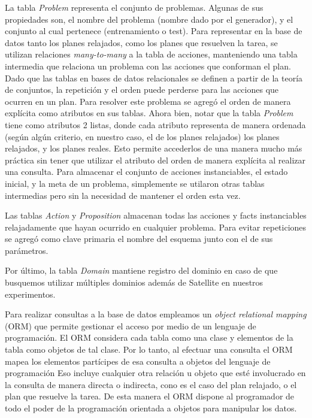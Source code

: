 La tabla \emph{Problem} representa el conjunto de problemas. Algunas de sus
propiedades son, el nombre del problema (nombre dado por el generador), y el
conjunto al cual pertenece (entrenamiento o test). Para representar en la base
de datos tanto los planes relajados, como los planes que resuelven la tarea, se
utilizan relaciones \emph{many-to-many} a la tabla de acciones, manteniendo una
tabla intermedia que relaciona un problema con las acciones que conforman el
plan. Dado que las tablas en bases de datos relacionales se definen a partir de
la teoría de conjuntos, la repetición y el orden puede perderse para las
acciones que ocurren en un plan. Para resolver este problema se agregó el orden
de manera explícita como atributos en sus tablas. Ahora bien, notar que la tabla
\emph{Problem} tiene como atributos 2 listas, donde cada atributo representa de
manera ordenada (según algún criterio, en nuestro caso, el de los planes
relajados) los planes relajados, y los planes reales. Esto permite accederlos de
una manera mucho más práctica sin tener que utilizar el atributo del orden de
manera explícita al realizar una consulta. Para almacenar el conjunto de
acciones instanciables, el estado inicial, y la meta de un problema, simplemente
se utilaron otras tablas intermedias pero sin la necesidad de mantener el orden
esta vez.

Las tablas \emph{Action} y \emph{Proposition} almacenan todas las acciones y
facts instanciables relajadamente que hayan ocurrido en cualquier problema. Para
evitar repeticiones se agregó como clave primaria el nombre del esquema junto
con el de sus parámetros.

Por último, la tabla \emph{Domain} mantiene registro del dominio en caso de que
busquemos utilizar múltiples dominios además de Satellite en nuestros
experimentos.

Para realizar consultas a la base de datos empleamos un \emph{object relational
mapping} (ORM) que permite gestionar el acceso por medio de un lenguaje de
programación. El ORM considera cada tabla como una clase y elementos de la tabla
como objetos de tal clase. Por lo tanto, al efectuar una consulta el ORM mapea
los elementos partícipes de esa consulta a objetos del lenguaje de programación
Eso incluye cualquier otra relación u objeto que esté involucrado en la consulta
de manera directa o indirecta, cono es el caso del plan relajado, o el plan que
resuelve la tarea. De esta manera el ORM dispone al programador de todo el poder
de la programación orientada a objetos para manipular los datos.

